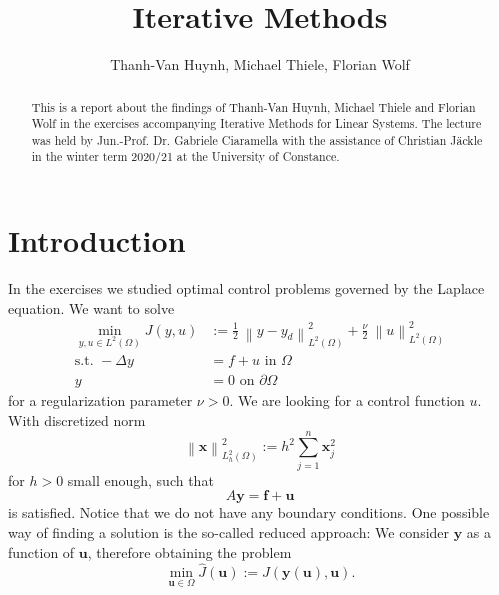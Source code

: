 \documentclass{amsart}
\theoremstyle{definition}
\theoremstyle{remark}
\numberwithin{equation}{section}
\renewcommand{\vec}{\textbf}
\newcommand{\norm}[1]{\left\lVert#1\right\rVert}
\begin{document}
\title{Iterative Methods}

\author{Thanh-Van Huynh, Michael Thiele, Florian Wolf}


\begin{abstract}
This is a report about the findings of Thanh-Van Huynh, Michael Thiele and Florian Wolf in the exercises accompanying Iterative Methods for Linear Systems. The lecture was held by Jun.-Prof. Dr. Gabriele Ciaramella with the assistance of Christian J\"ackle in the winter term 2020/21 at the University of Constance.
\end{abstract}

\maketitle

\tableofcontents



\section{Introduction}
In the exercises we studied optimal control problems governed by the Laplace equation. We want to solve
\begin{align}
\min\limits_{y,u\in L^2(\Omega)} J(y,u) &:= \frac{1}{2}\ \norm{y-y_d}
_{L^2(\Omega)}^2 + \frac{\nu}{2}\ \norm{u}_{L^2(\Omega)}^2\\
\text{s.t. } -\Delta y &= f+ u \text{ in } \Omega\\
y &= 0 \text{ on } \partial\Omega
\end{align}
for a regularization parameter $\nu > 0$. We are looking for a control function $u$. With discretized norm
\begin{equation*}
\norm{\vec{x}}_{L_h^2(\Omega)}^2 := h^2 \sum\limits_{j=1}^n \vec{x}_j^2
\end{equation*}
for $h>0$ small enough, such that
\begin{equation*}
A\vec{y}=\vec{f}+\vec{u}
\end{equation*}
is satisfied. Notice that we do not have any boundary conditions. One possible way of finding a solution is the so-called reduced approach: We consider $\vec{y}$ as a function of $\vec{u}$, therefore obtaining the problem
\begin{equation*}
\min\limits_{\vec{u}\in\Omega} \hat{J}(\vec{u}) := J(\vec{y}(\vec{u}),\vec{u}).
\end{equation*}
\end{document}
